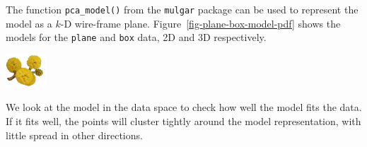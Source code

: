 \documentclass[
  letterpaper,
]{krantz}
\newcommand{\infobox}[1]{%
\noindent\colorbox{info!30}{%
\begin{minipage}{0.98\linewidth}%
    \centering%
    \begin{minipage}[c]{0.15\linewidth} %
      \includegraphics[width=1.5cm]{images/mulga-flowers2.png} %
    \end{minipage}%
    \hfill %
    \begin{minipage}[c]{0.8\linewidth} %
      \bigskip%
      \textsf{#1}%
      \bigskip%
    \end{minipage}%
    \hspace*{3mm}%
  \end{minipage}%
}%
}
\begin{document}
The function \texttt{pca\_model()} from the \texttt{mulgar} package can
be used to represent the model as a \(k\)-D wire-frame plane.
Figure~\ref{fig-plane-box-model-pdf} shows the models for the
\texttt{plane} and \texttt{box} data, 2D and 3D respectively.

\infobox{We look at the model in the data space to check how well the model fits the data. If it fits well, the points will cluster tightly around the model representation, with little spread in other directions.}

\begin{figure}

\begin{minipage}{0.50\linewidth}



\end{minipage}%
%
\begin{minipage}{0.50\linewidth}

\end{minipage}
\end{figure}
\end{document}

